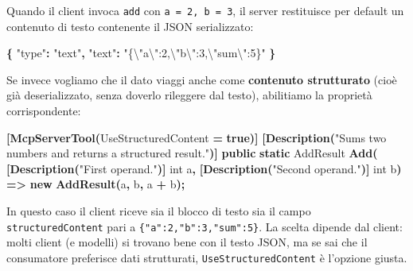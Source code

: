 \documentclass[
  italian,
  10pt,
]{book}
\newenvironment{Shaded}{\begin{snugshade}}{\end{snugshade}}
\newcommand{\CharTok}[1]{\textcolor[rgb]{0.31,0.60,0.02}{#1}}
\newcommand{\DataTypeTok}[1]{\textcolor[rgb]{0.13,0.29,0.53}{#1}}
\newcommand{\FunctionTok}[1]{\textcolor[rgb]{0.13,0.29,0.53}{\textbf{#1}}}
\newcommand{\KeywordTok}[1]{\textcolor[rgb]{0.13,0.29,0.53}{\textbf{#1}}}
\newcommand{\NormalTok}[1]{#1}
\newcommand{\OperatorTok}[1]{\textcolor[rgb]{0.81,0.36,0.00}{\textbf{#1}}}
\newcommand{\StringTok}[1]{\textcolor[rgb]{0.31,0.60,0.02}{#1}}
\begin{document}
Quando il client invoca \texttt{add} con \texttt{a\ =\ 2,\ b\ =\ 3}, il
server restituisce per default un contenuto di testo contenente il JSON
serializzato:

\begin{Shaded}
\begin{Highlighting}[]
\FunctionTok{\{} \DataTypeTok{"type"}\FunctionTok{:} \StringTok{"text"}\FunctionTok{,} \DataTypeTok{"text"}\FunctionTok{:} \StringTok{"\{}\CharTok{\textbackslash{}"}\StringTok{a}\CharTok{\textbackslash{}"}\StringTok{:2,}\CharTok{\textbackslash{}"}\StringTok{b}\CharTok{\textbackslash{}"}\StringTok{:3,}\CharTok{\textbackslash{}"}\StringTok{sum}\CharTok{\textbackslash{}"}\StringTok{:5\}"} \FunctionTok{\}}
\end{Highlighting}
\end{Shaded}

Se invece vogliamo che il dato viaggi anche come \textbf{contenuto
strutturato} (cioè già deserializzato, senza doverlo rileggere dal
testo), abilitiamo la proprietà corrispondente:

\begin{Shaded}
\begin{Highlighting}[]
\OperatorTok{[}\FunctionTok{McpServerTool}\OperatorTok{(}\NormalTok{UseStructuredContent }\OperatorTok{=} \KeywordTok{true}\OperatorTok{)]}
\OperatorTok{[}\FunctionTok{Description}\OperatorTok{(}\StringTok{"Sums two numbers and returns a structured result."}\OperatorTok{)]}
\KeywordTok{public} \KeywordTok{static}\NormalTok{ AddResult }\FunctionTok{Add}\OperatorTok{(}
    \OperatorTok{[}\FunctionTok{Description}\OperatorTok{(}\StringTok{"First operand."}\OperatorTok{)]} \DataTypeTok{int}\NormalTok{ a}\OperatorTok{,}
    \OperatorTok{[}\FunctionTok{Description}\OperatorTok{(}\StringTok{"Second operand."}\OperatorTok{)]} \DataTypeTok{int}\NormalTok{ b}\OperatorTok{)}
    \OperatorTok{=\textgreater{}} \KeywordTok{new} \FunctionTok{AddResult}\OperatorTok{(}\NormalTok{a}\OperatorTok{,}\NormalTok{ b}\OperatorTok{,}\NormalTok{ a }\OperatorTok{+}\NormalTok{ b}\OperatorTok{);}
\end{Highlighting}
\end{Shaded}

In questo caso il client riceve sia il blocco di testo sia il campo
\texttt{structuredContent} pari a \texttt{\{"a":2,"b":3,"sum":5\}}. La
scelta dipende dal client: molti client (e modelli) si trovano bene con
il testo JSON, ma se sai che il consumatore preferisce dati strutturati,
\texttt{UseStructuredContent} è l'opzione giusta.
\end{document}
